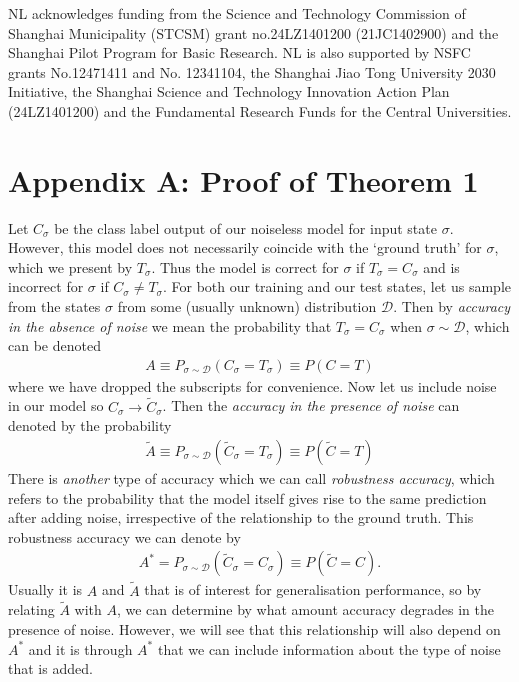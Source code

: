 \documentclass[onecolumn,prx, superscriptaddress,longbibliography,margin=1mm 11pt]{revtex4-2}
\begin{document}
 NL acknowledges funding from the Science and Technology Commission of Shanghai Municipality (STCSM) grant no.24LZ1401200 (21JC1402900) and the Shanghai Pilot Program for Basic Research. NL is also supported by NSFC grants No.12471411 and No. 12341104, the Shanghai Jiao Tong University 2030 Initiative, the Shanghai Science and Technology Innovation Action Plan (24LZ1401200) and the Fundamental Research Funds for the Central Universities.  

\section*{Appendix A: Proof of Theorem 1} \label{app:A}
Let $C_{\sigma} $ be the class label output of our noiseless model for input state $\sigma$.  However,  this model does not necessarily coincide with the `ground truth' for $\sigma$,  which we present by $T_{\sigma}$.  Thus the model is correct for $\sigma$ if $T_{\sigma}=C_{\sigma}$ and is incorrect for $\sigma$ if $C_{\sigma} \neq T_{\sigma}$.  For both our training and our test states,  let us sample from the states $\sigma$ from some (usually unknown) distribution $\mathcal{D}$.  Then by \textit{accuracy in the absence of noise} we mean the probability that $T_{\sigma}=C_{\sigma}$ when $\sigma \sim \mathcal{D}$,  which can be denoted 
\begin{align}
A \equiv P_{\sigma \sim \mathcal{D}}(C_{\sigma}=T_{\sigma}) \equiv P(C=T)
\end{align} 
where we have dropped the subscripts for convenience.  Now let us include noise in our model so $C_{\sigma} \rightarrow \tilde{C}_{\sigma}$. Then the \textit{accuracy in the presence of noise} can denoted by the probability
\begin{align}
\tilde{A} \equiv P_{\sigma \sim \mathcal{D}}(\tilde{C}_{\sigma}=T_{\sigma}) \equiv P(\tilde{C}=T)
\end{align}
There is \textit{another} type of accuracy which we can call \textit{robustness accuracy},  which refers to the probability that the model itself gives rise to the same prediction after adding noise,  irrespective of the relationship to the ground truth.  This robustness accuracy we can denote by 
\begin{align}
A^*=P_{\sigma \sim \mathcal{D}}(\tilde{C}_{\sigma}=C_{\sigma}) \equiv P(\tilde{C}=C).
\end{align}
Usually it is $A$ and $\tilde{A}$ that is of interest for generalisation performance,  so by relating $\tilde{A}$ with $A$,  we can determine by what amount accuracy degrades in the presence of noise.  However,  we will see that this relationship will also depend on $A^*$ and it is through $A^*$ that we can include information about the type of noise that is added.  \\
\end{document}
